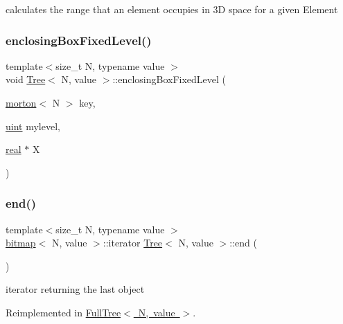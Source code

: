 calculates the range that an element occupies in 3D space for a given Element \mbox{\label{classTree_a49dcce2706c8e330950ac362826c3a9d}} 
\subsubsection{\texorpdfstring{enclosing\+Box\+Fixed\+Level()}{enclosingBoxFixedLevel()}}
{\footnotesize\ttfamily template$<$size\+\_\+t N, typename value $>$ \\
void \mbox{\hyperlink{classTree}{Tree}}$<$ N, value $>$\+::enclosing\+Box\+Fixed\+Level (\begin{DoxyParamCaption}\item[{\mbox{\hyperlink{definitions_8h_af8682350bd8bb38ee9023f7a0a310add}{morton}}$<$ N $>$}]{key,  }\item[{\mbox{\hyperlink{definitions_8h_a69aa29b598b851b0640aa225a9e5d61d}{uint}}}]{mylevel,  }\item[{\mbox{\hyperlink{definitions_8h_aedc0ad84d1e764530814f57ad931d02a}{real}} $\ast$}]{X }\end{DoxyParamCaption})}

\mbox{\label{classTree_a780c144c3fa4f648e7c616d7010721b0}} 
\subsubsection{\texorpdfstring{end()}{end()}}
{\footnotesize\ttfamily template$<$size\+\_\+t N, typename value $>$ \\
\mbox{\hyperlink{definitions_8h_acf2396ef4de9eb8a6324b9f1a624ea85}{bitmap}}$<$ N, value $>$\+::iterator \mbox{\hyperlink{classTree}{Tree}}$<$ N, value $>$\+::end (\begin{DoxyParamCaption}{ }\end{DoxyParamCaption})\hspace{0.3cm}{\ttfamily [virtual]}}

iterator returning the last object 

Reimplemented in \mbox{\hyperlink{classFullTree_a692131b057639fecdb1934b734cff1bb}{Full\+Tree$<$ N, value $>$}}.

\mbox{\label{classTree_afe37f37ae3c392c4df2abdf07dd7c5a3}} 
